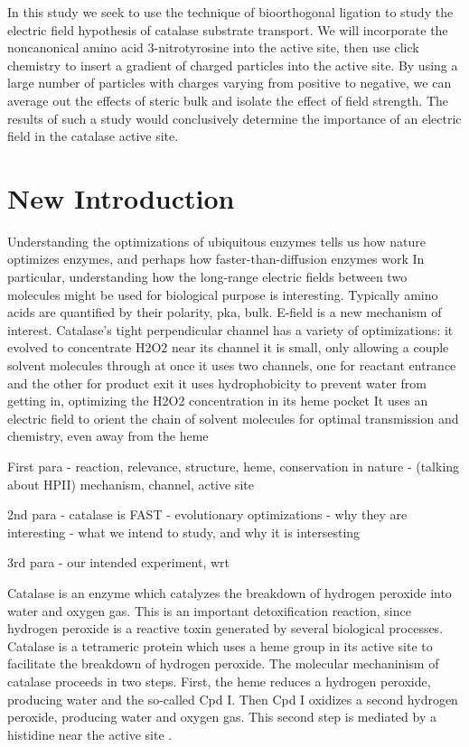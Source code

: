 \documentclass[journal=jacsat,manuscript=article]{achemso}
\begin{document}
In this study we seek to use the technique of bioorthogonal ligation to study the electric field hypothesis of catalase substrate transport. We will incorporate the noncanonical amino acid 3-nitrotyrosine into the active site, then use click chemistry to insert a gradient of charged particles into the active site. By using a large number of particles with charges varying from positive to negative, we can average out the effects of steric bulk and isolate the effect of field strength. The results of such a study would conclusively determine the importance of an electric field in the catalase active site.\\

\section{New Introduction}
Understanding the optimizations of ubiquitous enzymes tells us how nature optimizes enzymes, and perhaps how faster-than-diffusion enzymes work
In particular, understanding how the long-range electric fields between two molecules might be used for biological purpose is interesting. Typically amino acids are quantified by their polarity, pka, bulk. E-field is a new mechanism of interest.
Catalase's tight perpendicular channel has a variety of optimizations:
   it evolved to concentrate H2O2 near its channel
   it is small, only allowing a couple solvent molecules through at once
   it uses two channels, one for reactant entrance and the other for product exit
   it uses hydrophobicity to prevent water from getting in, optimizing the H2O2 concentration in its heme pocket
   It uses an electric field to orient the chain of solvent molecules for optimal transmission and chemistry, even away from the heme

First para
- reaction, relevance, structure, heme, conservation in nature
- (talking about HPII) mechanism, channel, active site

2nd para
- catalase is FAST
- evolutionary optimizations
- why they are interesting
- what we intend to study, and why it is intersesting

3rd para
- our intended experiment, wrt 

Catalase is an enzyme which catalyzes the breakdown of hydrogen peroxide into water and oxygen gas. This is an important detoxification reaction, since hydrogen peroxide is a reactive toxin generated by several biological processes. Catalase is a tetrameric protein which uses a heme group in its active site to facilitate the breakdown of hydrogen peroxide. The molecular mechaninism of catalase proceeds in two steps. First, the heme reduces a hydrogen peroxide, producing water and the so-called Cpd I. Then Cpd I oxidizes a second hydrogen peroxide, producing water and oxygen gas. This second step is mediated by a histidine near the active site \cite{alfonso-prieto}.
\end{document}

